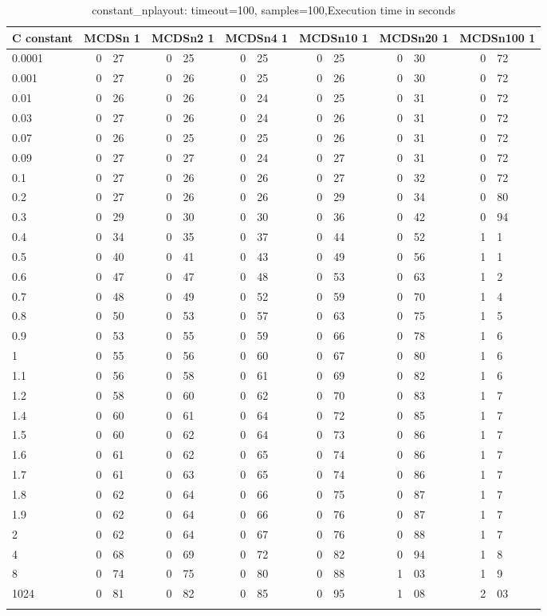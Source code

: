 \begin{table}
    \caption{constant_nplayout: timeout=100, samples=100,Execution time in seconds}
    \begin{tabular}{l*6{r@{.}l}} 
        \toprule
        C constant & \multicolumn{2}{c}{MCDSn 1}&\multicolumn{2}{c}{MCDSn2 1}&\multicolumn{2}{c}{MCDSn4 1}&\multicolumn{2}{c}{MCDSn10 1}&\multicolumn{2}{c}{MCDSn20 1}&\multicolumn{2}{c}{MCDSn100 1}\\
        \midrule
        0.0001 & 0&27 & 0&25 & 0&25 & 0&25 & 0&30 & 0&72\\
        0.001 & 0&27 & 0&26 & 0&25 & 0&26 & 0&30 & 0&72\\
        0.01 & 0&26 & 0&26 & 0&24 & 0&25 & 0&31 & 0&72\\
        0.03 & 0&27 & 0&26 & 0&24 & 0&26 & 0&31 & 0&72\\
        0.07 & 0&26 & 0&25 & 0&25 & 0&26 & 0&31 & 0&72\\
        0.09 & 0&27 & 0&27 & 0&24 & 0&27 & 0&31 & 0&72\\
        0.1 & 0&27 & 0&26 & 0&26 & 0&27 & 0&32 & 0&72\\
        0.2 & 0&27 & 0&26 & 0&26 & 0&29 & 0&34 & 0&80\\
        0.3 & 0&29 & 0&30 & 0&30 & 0&36 & 0&42 & 0&94\\
        0.4 & 0&34 & 0&35 & 0&37 & 0&44 & 0&52 & 1&1\\
        0.5 & 0&40 & 0&41 & 0&43 & 0&49 & 0&56 & 1&1\\
        0.6 & 0&47 & 0&47 & 0&48 & 0&53 & 0&63 & 1&2\\
        0.7 & 0&48 & 0&49 & 0&52 & 0&59 & 0&70 & 1&4\\
        0.8 & 0&50 & 0&53 & 0&57 & 0&63 & 0&75 & 1&5\\
        0.9 & 0&53 & 0&55 & 0&59 & 0&66 & 0&78 & 1&6\\
        1 & 0&55 & 0&56 & 0&60 & 0&67 & 0&80 & 1&6\\
        1.1 & 0&56 & 0&58 & 0&61 & 0&69 & 0&82 & 1&6\\
        1.2 & 0&58 & 0&60 & 0&62 & 0&70 & 0&83 & 1&7\\
        1.4 & 0&60 & 0&61 & 0&64 & 0&72 & 0&85 & 1&7\\
        1.5 & 0&60 & 0&62 & 0&64 & 0&73 & 0&86 & 1&7\\
        1.6 & 0&61 & 0&62 & 0&65 & 0&74 & 0&86 & 1&7\\
        1.7 & 0&61 & 0&63 & 0&65 & 0&74 & 0&86 & 1&7\\
        1.8 & 0&62 & 0&64 & 0&66 & 0&75 & 0&87 & 1&7\\
        1.9 & 0&62 & 0&64 & 0&66 & 0&76 & 0&87 & 1&7\\
        2 & 0&62 & 0&64 & 0&67 & 0&76 & 0&88 & 1&7\\
        4 & 0&68 & 0&69 & 0&72 & 0&82 & 0&94 & 1&8\\
        8 & 0&74 & 0&75 & 0&80 & 0&88 & 1&03 & 1&9\\
        1024 & 0&81 & 0&82 & 0&85 & 0&95 & 1&08 & 2&03\\
        \bottomrule
    \label{constant_nplayout}
    \end{tabular}
\end{table}